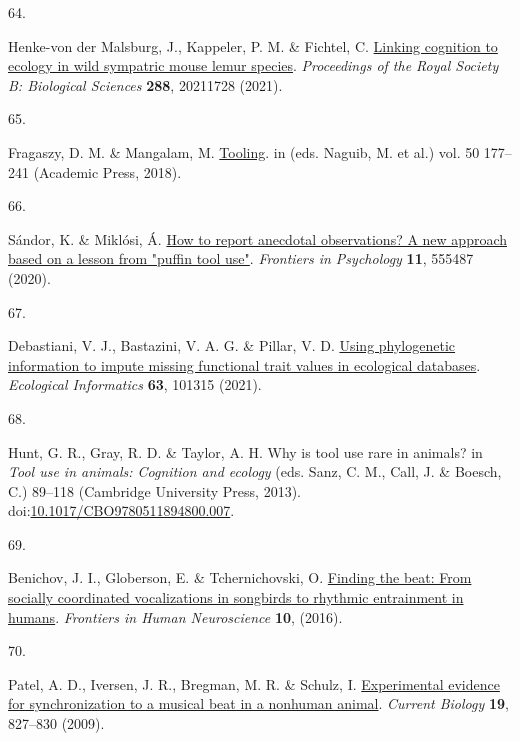 \documentclass[
  man,floatsintext]{apa6}
\newlength{\cslhangindent}
\newlength{\csllabelwidth}
\newlength{\cslentryspacingunit} %
\newenvironment{CSLReferences}[2] %
 {%
  \setlength{\parindent}{0pt}
  \ifodd #1
  \let\oldpar\par
  \def\par{\hangindent=\cslhangindent\oldpar}
  \fi
  \setlength{\parskip}{#2\cslentryspacingunit}
 }%
 {}
\newcommand{\CSLLeftMargin}[1]{\parbox[t]{\csllabelwidth}{#1}}
\newcommand{\CSLRightInline}[1]{\parbox[t]{\linewidth - \csllabelwidth}{#1}\break}
\begin{document}
\begin{CSLReferences}{0}{0}
\leavevmode{}%
\CSLLeftMargin{64. }%
\CSLRightInline{Henke-von der Malsburg, J., Kappeler, P. M. \& Fichtel, C. \href{https://doi.org/10.1098/rspb.2021.1728}{Linking cognition to ecology in wild sympatric mouse lemur species}. \emph{Proceedings of the Royal Society B: Biological Sciences} \textbf{288}, 20211728 (2021).}

\leavevmode{}%
\CSLLeftMargin{65. }%
\CSLRightInline{Fragaszy, D. M. \& Mangalam, M. \href{https://doi.org/10.1016/bs.asb.2018.01.001}{Tooling}. in (eds. Naguib, M. et al.) vol. 50 177--241 (Academic Press, 2018).}

\leavevmode{}%
\CSLLeftMargin{66. }%
\CSLRightInline{Sándor, K. \& Miklósi, Á. \href{https://doi.org/10.3389/fpsyg.2020.555487}{How to report anecdotal observations? A new approach based on a lesson from "puffin tool use"}. \emph{Frontiers in Psychology} \textbf{11}, 555487 (2020).}

\leavevmode{}%
\CSLLeftMargin{67. }%
\CSLRightInline{Debastiani, V. J., Bastazini, V. A. G. \& Pillar, V. D. \href{https://doi.org/10.1016/j.ecoinf.2021.101315}{Using phylogenetic information to impute missing functional trait values in ecological databases}. \emph{Ecological Informatics} \textbf{63}, 101315 (2021).}

\leavevmode{}%
\CSLLeftMargin{68. }%
\CSLRightInline{Hunt, G. R., Gray, R. D. \& Taylor, A. H. Why is tool use rare in animals? in \emph{Tool use in animals: Cognition and ecology} (eds. Sanz, C. M., Call, J. \& Boesch, C.) 89--118 (Cambridge University Press, 2013). doi:\href{https://doi.org/10.1017/CBO9780511894800.007}{10.1017/CBO9780511894800.007}.}

\leavevmode{}%
\CSLLeftMargin{69. }%
\CSLRightInline{Benichov, J. I., Globerson, E. \& Tchernichovski, O. \href{https://doi.org/10.3389/fnhum.2016.00255}{Finding the beat: From socially coordinated vocalizations in songbirds to rhythmic entrainment in humans}. \emph{Frontiers in Human Neuroscience} \textbf{10}, (2016).}

\leavevmode{}%
\CSLLeftMargin{70. }%
\CSLRightInline{Patel, A. D., Iversen, J. R., Bregman, M. R. \& Schulz, I. \href{https://doi.org/10.1016/j.cub.2009.03.038}{Experimental evidence for synchronization to a musical beat in a nonhuman animal}. \emph{Current Biology} \textbf{19}, 827--830 (2009).}


\end{CSLReferences}
\end{document}
